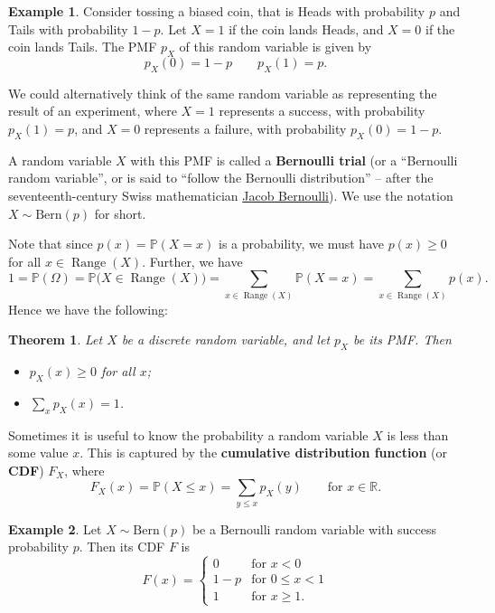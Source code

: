\documentclass[
  a4paper,
]{book}
\providecommand{\tightlist}{%
  \setlength{\itemsep}{0pt}\setlength{\parskip}{0pt}}
\newtheorem{theorem}{Theorem}[chapter]
\theoremstyle{definition}
\theoremstyle{definition}
\newtheorem{example}{Example}[chapter]
\theoremstyle{definition}
\theoremstyle{definition}
\theoremstyle{remark}
\begin{document}
\begin{example}
Consider tossing a biased coin, that is Heads with probability \(p\) and Tails with probability \(1-p\). Let \(X = 1\) if the coin lands Heads, and \(X = 0\) if the coin lands Tails. The PMF \(p_X\) of this random variable is given by
\[ p_X(0) = 1 - p \qquad p_X(1) = p . \]

We could alternatively think of the same random variable as representing the result of an experiment, where \(X = 1\) represents a success, with probability \(p_X(1) = p\), and \(X = 0\) represents a failure, with probability \(p_X(0) = 1 - p\).

A random variable \(X\) with this PMF is called a \textbf{Bernoulli trial} (or a ``Bernoulli random variable'', or is said to ``follow the Bernoulli distribution'' -- after the seventeenth-century Swiss mathematician \href{https://mathshistory.st-andrews.ac.uk/Biographies/Bernoulli_Jacob/}{Jacob Bernoulli}). We use the notation \(X \sim \text{Bern}(p)\) for short.
\end{example}

Note that since \(p(x) = \mathbb P(X = x)\) is a probability, we must have \(p(x) \geq 0\) for all \(x \in \operatorname{Range}(X)\). Further, we have
\[ 1 = \mathbb P(\Omega) = \mathbb P\big(X \in \operatorname{Range}(X)\big) = \sum_{x \in \operatorname{Range}(X)} \mathbb P(X = x) = \sum_{x \in \operatorname{Range}(X)} p(x) . \]
Hence we have the following:

\begin{theorem}

Let \(X\) be a discrete random variable, and let \(p_X\) be its PMF. Then

\begin{itemize}
\tightlist
\item
  \(p_X(x) \geq 0\) for all \(x\);
\item
  \({\displaystyle \sum_x p_X(x) = 1}\).
\end{itemize}

\end{theorem}

Sometimes it is useful to know the probability a random variable \(X\) is less than some value \(x\). This is captured by the \textbf{cumulative distribution function} (or \textbf{CDF}) \(F_X\), where
\[ F_X(x) = \mathbb P(X \leq x) = \sum_{y \leq x} p_X(y) \qquad \text{for $x \in \mathbb R$.}  \]

\begin{example}
Let \(X \sim \text{Bern}(p)\) be a Bernoulli random variable with success probability \(p\). Then its CDF \(F\) is
\[ F(x) = \begin{cases} 0 & \text{for $x < 0$} \\
                      1-p & \text{for $0 \leq x < 1$} \\
                      1   & \text{for $x \geq 1$} . \end{cases} \]
\end{example}
\end{document}
